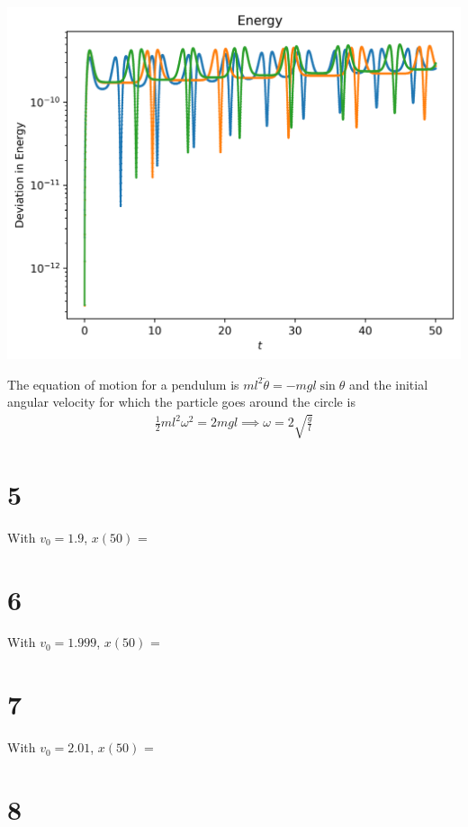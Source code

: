 \documentclass{article}
\begin{document}
\begin{center}
    \includegraphics*[scale=0.8]{7E.png}
\end{center}

The equation of motion for a pendulum is $ml^2 \ddot{\theta} = -mg l \sin \theta$ and the initial angular velocity for which the particle goes around the circle is
\begin{align*}
    \frac{1}{2}ml^2 \omega^2 = 2 m g l \implies \omega = 2 \sqrt{\frac{g}{l}}
\end{align*}

\section*{5}

With $v_0 = 1.9$, $x(50)$ = 

\section*{6}

With $v_0 = 1.999$, $x(50)$ = 

\section*{7}

With $v_0 = 2.01$, $x(50)$ = 

\section*{8}
\end{document}
